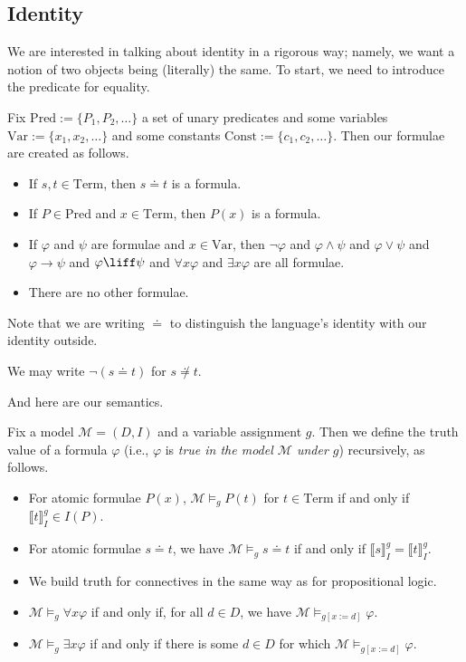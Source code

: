 \documentclass[../notes.tex]{subfiles}
\begin{document}
\subsection{Identity}
We are interested in talking about identity in a rigorous way; namely, we want a notion of two objects being (literally) the same. To start, we need to introduce the predicate for equality.
\begin{defihelper}
	Fix $\mathrm{Pred}:=\{P_1,P_2,\ldots\}$ a set of unary predicates and some variables $\mathrm{Var}:=\{x_1,x_2,\ldots\}$ and some constants $\mathrm{Const}:=\{c_1,c_2,\ldots\}$. Then our formulae are created as follows.
	\begin{itemize}
		\item If $s,t\in\mathrm{Term}$, then $s\doteq t$ is a formula.
		\item If $P\in\mathrm{Pred}$ and $x\in\mathrm{Term}$, then $P(x)$ is a formula.
		\item If $\varphi$ and $\psi$ are formulae and $x\in\mathrm{Var}$, then $\lnot\varphi$ and $\varphi\land\psi$ and $\varphi\lor\psi$ and $\varphi\to\psi$ and $\varphi\liff\psi$ and $\forall x\varphi$ and $\exists x\varphi$ are all formulae.
		\item There are no other formulae.
	\end{itemize}
\end{defihelper}
Note that we are writing $\doteq $ to distinguish the language's identity with our identity outside.
\begin{notation}
	We may write $\lnot(s\doteq t)$ for $s\not\doteq t$.
\end{notation}
And here are our semantics.
\begin{defihelper}[Truth]
	Fix a model $\mathcal M=(D,I)$ and a variable assignment $g$. Then we define the truth value of a formula $\varphi$ (i.e., $\varphi$ is \textit{true in the model $\mathcal M$ under $g$}) recursively, as follows.
	\begin{itemize}
		\item For atomic formulae $P(x)$, $\mathcal M\models_gP(t)$ for $t\in\mathrm{Term}$ if and only if $\llbracket t\rrbracket_I^g\in I(P)$.
		\item For atomic formulae $s\doteq t$, we have $\mathcal M\models_gs\doteq t$ if and only if $\llbracket s\rrbracket_I^g=\llbracket t\rrbracket_I^g$.
		\item We build truth for connectives in the same way as for propositional logic.
		\item $\mathcal M\models_g\forall x\varphi$ if and only if, for all $d\in D$, we have $\mathcal M\models_{g[x:=d]}\varphi$.
		\item $\mathcal M\models_g\exists x\varphi$ if and only if there is some $d\in D$ for which $\mathcal M\models_{g[x:=d]}\varphi$.
	\end{itemize}
\end{defihelper}
\end{document}
